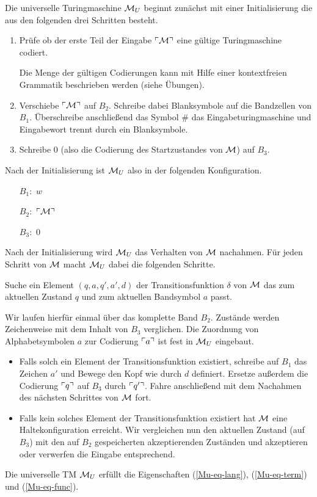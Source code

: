 Die universelle Turingmaschine $\mathcal{M}_U$ beginnt zunächst mit einer Initialisierung die aus den folgenden drei Schritten besteht.

\begin{enumerate}
 \item Prüfe ob der erste Teil der Eingabe $\ulcorner \mathcal{M} \urcorner$ eine gültige Turingmaschine codiert.
 
 Die Menge der gültigen Codierungen kann mit Hilfe einer kontextfreien Grammatik beschrieben werden (siehe Übungen).
 
 \item Verschiebe $\ulcorner \mathcal{M} \urcorner$ auf $B_2$. Schreibe dabei Blanksymbole auf die Bandzellen von $B_1$.
 Überschreibe anschließend das Symbol $\#$ das Eingabeturingmaschine und Eingabewort trennt durch ein Blanksymbole.
 
 \item Schreibe $0$ (also die Codierung des Startzustandes von $\mathcal{M}$) auf $B_3$.
\end{enumerate}

Nach der Initialisierung ist $\mathcal{M}_U$ also in der folgenden Konfiguration.
\begin{itemize}
\item[$B_1:$] $w$
\item[$B_2:$] $\ulcorner \mathcal{M} \urcorner$
\item[$B_3:$] $0$
\end{itemize}

Nach der Initialisierung wird $\mathcal{M}_U$ das Verhalten von $\mathcal{M}$ nachahmen.
Für jeden Schritt von $\mathcal{M}$ macht $\mathcal{M}_U$ dabei die folgenden Schritte.

 Suche ein Element $(q, a, q', a', d)$ der Transitionsfunktion $\delta$ von $\mathcal{M}$ das zum aktuellen Zustand $q$ und zum aktuellen Bandsymbol $a$ passt.
 
 Wir laufen hierfür einmal über das komplette Band $B_2$. 
 Zustände werden Zeichenweise mit dem Inhalt von $B_3$ verglichen.
 Die Zuordnung von Alphabetsymbolen $a$ zur Codierung $\ulcorner a \urcorner$ ist fest in $\mathcal{M}_U$ eingebaut.
 
 \begin{itemize}
 
 \item Falls solch ein Element der Transitionsfunktion existiert,
    schreibe auf $B_1$ das Zeichen $a'$ und Bewege den Kopf wie durch $d$ definiert.
    Ersetze außerdem die Codierung $\ulcorner q \urcorner$ auf $B_3$ durch $\ulcorner q' \urcorner$.
    Fahre anschließend mit dem Nachahmen des nächsten Schrittes von $\mathcal{M}$ fort.
    
 \item Falls kein solches Element der Transitionsfunktion existiert hat $\mathcal{M}$ eine Haltekonfiguration erreicht.
 Wir vergleichen nun den aktuellen Zustand (auf $B_3$) mit den auf $B_2$ gespeicherten akzeptierenden Zuständen und akzeptieren oder verwerfen die Eingabe entsprechend.

\end{itemize}

\begin{Satz}
	Die universelle \ac{TM} $\mathcal{M}_U$ erfüllt die Eigenschaften (\ref{Mu-eq-lang}), (\ref{Mu-eq-term}) und (\ref{Mu-eq-func}).
\end{Satz}


